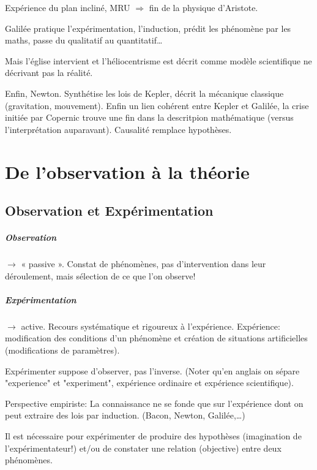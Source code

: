 \documentclass{report}
\begin{document}
	Expérience du plan incliné, MRU $\Rightarrow$ fin de la physique d'Aristote.
	
	Galilée pratique l'expérimentation, l'induction, prédit les phénomène par les maths, passe du qualitatif au quantitatif\dots
	
	Mais l'église intervient et l'héliocentrisme est décrit comme modèle scientifique ne décrivant pas la réalité.
	
	Enfin, Newton. Synthétise les lois de Kepler, décrit la mécanique classique (gravitation, mouvement). Enfin un lien cohérent entre Kepler et Galilée, la crise initiée par Copernic trouve une fin dans la descritpion mathématique (versus l'interprétation auparavant). Causalité remplace hypothèses.
	
	\chapter{De l'observation à la théorie}
	
	\section{Observation et Expérimentation}
	
	\paragraph{Observation} $\rightarrow$ « passive ». Constat de phénomènes, pas d’intervention dans leur déroulement, mais sélection de ce que l’on observe!
	\paragraph{Expérimentation} $\rightarrow$ active. Recours systématique et rigoureux à l’expérience. Expérience: modification des conditions d’un phénomène et création de situations artificielles (modifications de paramètres).
	
	Expérimenter suppose d'observer, pas l'inverse. (Noter qu'en anglais on sépare "experience" et "experiment", expérience ordinaire et expérience scientifique).
	
	Perspective empiriste: La connaissance ne se fonde que sur l’expérience dont on peut extraire des lois par induction. (Bacon, Newton, Galilée,\dots)
	
	Il est nécessaire pour expérimenter de produire des hypothèses (imagination de l'expérimentateur!) et/ou de constater une relation (objective) entre deux phénomènes.
	
\end{document}
